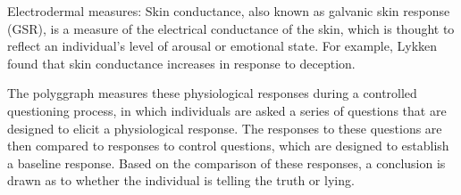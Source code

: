 \documentclass[onecolumn, compsoc,10pt]{IEEEtran}
\def\SUPPLEMENTARY{Supplementary\xspace}
\def\METHODS{Online Methods\xspace}
\begin{document}
Electrodermal measures: Skin conductance, also known as galvanic skin response (GSR), is a measure of the electrical conductance of the skin, which is thought to reflect an individual's level of arousal or emotional state. For example, Lykken~\cite{Lykken1959} found that skin conductance increases in response to deception.

The polyggraph measures these physiological responses during a controlled questioning process, in which individuals are asked a series of questions that are designed to elicit a physiological response. The responses to these questions are then compared to responses to control questions, which are designed to establish a baseline response. Based on the comparison of these responses, a conclusion is drawn as to whether the individual is telling the truth or lying.










\end{document}
